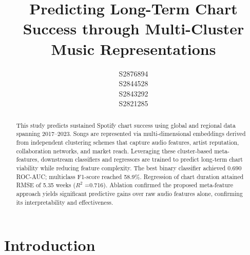 \documentclass{article}
\title{Predicting Long-Term Chart Success through Multi-Cluster Music Representations}
\author{
  S2876894\\
  \And
  S2844528\\
 \And
  S2843292\\
  \And
  S2821285\\
}
\begin{document}
\maketitle

\begin{abstract}
This study predicts sustained Spotify chart success using global and regional data spanning 2017–2023. Songs are represented via multi-dimensional embeddings derived from independent clustering schemes that capture audio features, artist reputation, collaboration networks, and market reach. Leveraging these cluster-based meta-features, downstream classifiers and regressors are trained to predict long-term chart viability while reducing feature complexity. The best binary classifier achieved 0.690 ROC-AUC; multiclass F1-score reached 58.9\%. Regression of chart duration attained RMSE of 5.35 weeks ($R^2$ =0.716). Ablation confirmed the proposed meta-feature approach yields significant predictive gains over raw audio features alone, confirming its interpretability and effectiveness. 
\end{abstract}
\vspace{-1em}

\section{Introduction}
\vspace{-0.6em}
\end{document}

